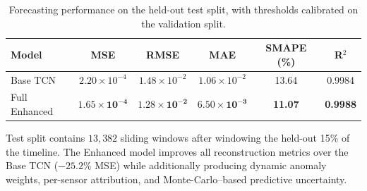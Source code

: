 \begin{table}[h!]
\centering
\caption{Forecasting performance on the held-out test split, with thresholds calibrated on the validation split.}
\label{table:comparison-baseline}
\begin{tabularx}{\linewidth}{lccccc}
\hline
\textbf{Model} & \textbf{MSE} & \textbf{RMSE} & \textbf{MAE} & \textbf{SMAPE (\%)} & \textbf{R$^2$} \\
\hline
Base TCN & $2.20\times 10^{-4}$ & $1.48\times 10^{-2}$ & $1.06\times 10^{-2}$ & 13.64 & 0.9984 \\
Full Enhanced & $\mathbf{1.65\times 10^{-4}}$ & $\mathbf{1.28\times 10^{-2}}$ & $\mathbf{6.50\times 10^{-3}}$ & \textbf{11.07} & \textbf{0.9988} \\
\hline
\end{tabularx}
\begin{flushleft}
\footnotesize Test split contains $13{,}382$ sliding windows after windowing the held-out 15\% of the timeline. The Enhanced model improves all reconstruction metrics over the Base TCN ($-25.2\%$ MSE) while additionally producing dynamic anomaly weights, per-sensor attribution, and Monte-Carlo--based predictive uncertainty.
\end{flushleft}
\end{table}
